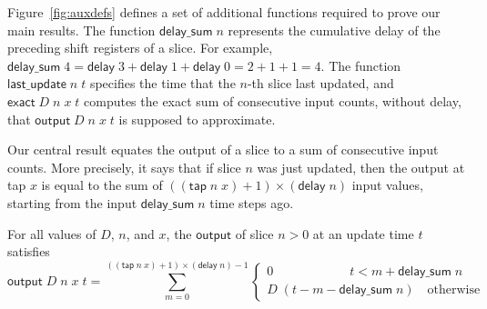 \documentclass{llncs}
\begin{document}
Figure~\ref{fig:auxdefs} defines a set of additional functions required to prove our main results.
The function $\mathsf{delay\_sum}\;n$ represents the cumulative delay of the preceding shift registers of a slice.
For example, $\mathsf{delay\_sum}\;4 = \mathsf{delay}\;3 + \mathsf{delay}\;1 + \mathsf{delay}\;0 = 2 +1 +1 = 4$.
The function $\mathsf{last\_update}\;n\;t$ specifies the time that the $n$-th slice last updated, and $\mathsf{exact}\;D\;n\;x\;t$ computes the exact sum of consecutive input counts, without delay, that $\mathsf{output}\;D\;n\;x\;t$ is supposed to approximate.

Our central result equates the output of a slice to a sum of consecutive input counts.
More precisely, it says that if slice $n$ was just updated, then the output at tap $x$ is equal to the sum of $((\mathsf{tap}\;n\;x)+1)\times(\mathsf{delay}\;n)$ input values, starting from the input $\mathsf{delay\_sum}\;n$ time steps ago.

\begin{theorem}\label{output_input_at_update_times}
For all values of $D$, $n$, and $x$, the $\mathsf{output}$ of slice $n>0$ at an update time $t$ satisfies
\begin{equation*}
\mathsf{output}\;D\;n\;x\;t=\sum_{m=0}^{((\mathsf{tap}\;n\;x)+1)\times(\mathsf{delay}\;n)-1}\begin{cases}0 \qquad\qquad\qquad  t<m+\mathsf{delay\_sum}\;n\\D\;(t-m-\mathsf{delay\_sum}\;n)\quad\text{otherwise}\end{cases}
\end{equation*}
\end{theorem}
\end{document}
